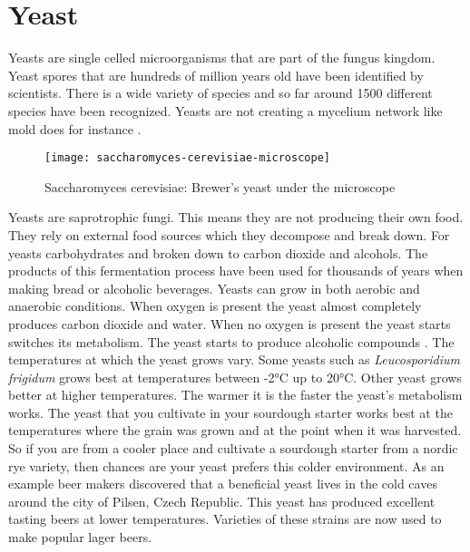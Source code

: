 \section{Yeast}

Yeasts are single celled microorganisms that are part of
the fungus kingdom. Yeast spores that are hundreds
of million years old have been identified by scientists.
There is a wide variety of species and so far around 1500
different species have been recognized. Yeasts are not creating
a mycelium network like mold does for instance
\cite{molecular+mechanisms+yeast}.

\begin{figure}[!htb]
  \centering
  \texttt{[image: saccharomyces-cerevisiae-microscope]}
  \caption{Saccharomyces cerevisiae: Brewer's yeast under the microscope}
  \label{saccharomyces-cerevisiae-microscope}
\end{figure}


Yeasts are saprotrophic fungi. This means they are not
producing their own food. They rely on external food sources
which they decompose and break down. For yeasts
carbohydrates and broken down to carbon dioxide and
alcohols. The products of this fermentation process
have been used for thousands of years when making
bread or alcoholic beverages. Yeasts can grow
in both aerobic and anaerobic conditions. When oxygen
is present the yeast almost completely produces
carbon dioxide and water. When no oxygen is present
the yeast starts switches its metabolism. The
yeast starts to produce alcoholic compounds \cite{effects+oxygen+yeast+growth}.
The temperatures at which the yeast grows vary. Some
yeasts such as {\it Leucosporidium frigidum} grows
best at temperatures between -2°C up to 20°C. Other
yeast grows better at higher temperatures. The warmer
it is the faster the yeast's metabolism works. The yeast
that you cultivate in your sourdough starter works best
at the temperatures where the grain was grown and at
the point when it was harvested. So if you are from a 
cooler place and cultivate a sourdough starter from
a nordic rye variety, then chances are your yeast
prefers this colder environment. As an example
beer makers discovered that a beneficial yeast lives
in the cold caves around the city of Pilsen, Czech Republic.
This yeast has produced excellent tasting beers at
lower temperatures. Varieties of these strains
are now used to make popular lager beers.

